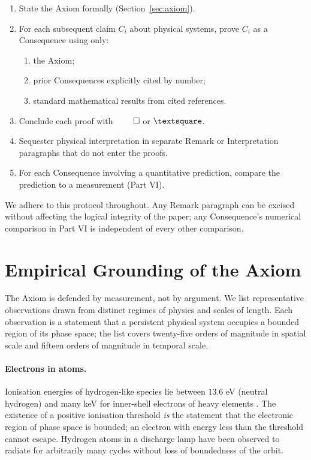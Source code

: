 \begin{protocol}
\label{proto:main}
\begin{enumerate}
\item State the Axiom formally (Section~\ref{sec:axiom}).
\item For each subsequent claim $C_{i}$ about physical systems, prove $C_{i}$ as a Consequence using only:
  \begin{enumerate}
  \item the Axiom;
  \item prior Consequences explicitly cited by number;
  \item standard mathematical results from cited references.
  \end{enumerate}
\item Conclude each proof with $\qed$ or $\text{\textsquare}$.
\item Sequester physical interpretation in separate Remark or Interpretation paragraphs that do not enter the proofs.
\item For each Consequence involving a quantitative prediction, compare the prediction to a measurement (Part VI).
\end{enumerate}
\end{protocol}

We adhere to this protocol throughout. Any Remark paragraph can be excised without affecting the logical integrity of the paper; any Consequence's numerical comparison in Part VI is independent of every other comparison.

\section{Empirical Grounding of the Axiom}
\label{sec:empiricalground}

The Axiom is defended by measurement, not by argument. We list representative observations drawn from distinct regimes of physics and scales of length. Each observation is a statement that a persistent physical system occupies a bounded region of its phase space; the list covers twenty-five orders of magnitude in spatial scale and fifteen orders of magnitude in temporal scale.

\paragraph{Electrons in atoms.} Ionisation energies of hydrogen-like species lie between $13.6$ eV (neutral hydrogen) and many keV for inner-shell electrons of heavy elements \citep{nistasd,herzberg1944,griffiths2018}. The existence of a positive ionisation threshold \emph{is} the statement that the electronic region of phase space is bounded; an electron with energy less than the threshold cannot escape. Hydrogen atoms in a discharge lamp have been observed to radiate for arbitrarily many cycles without loss of boundedness of the orbit.

